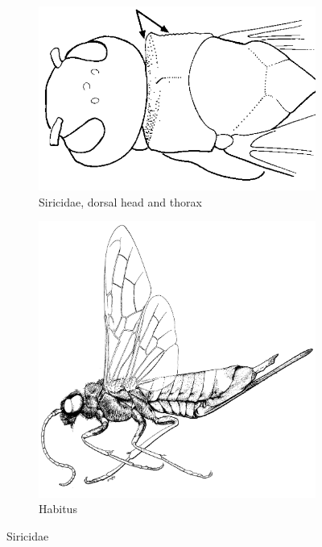 \documentclass[letterpaper, 11pt]{article}
\begin{document}
\begin{figure}[ht!]
    \centering
    \begin{subfigure}[ht!]{0.36\textwidth}
        \includegraphics[width=\textwidth]{SiricidPronotum}
        \caption{Siricidae, dorsal head and thorax \citep[][pg. 70]{goulet1993hymenoptera}}
        \label{fig:siricid1}
    \end{subfigure}
    \hfill
    \begin{subfigure}[ht!]{0.42\textwidth}
        \includegraphics[width=\textwidth]{SiricidHabitus}
        \caption{Habitus \citep[][Fig. 25]{goulet1993hymenoptera}}
        \label{fig:siricid2}
    \end{subfigure}
    \caption{Siricidae}\label{fig:siricids}
\end{figure}
\end{document}
